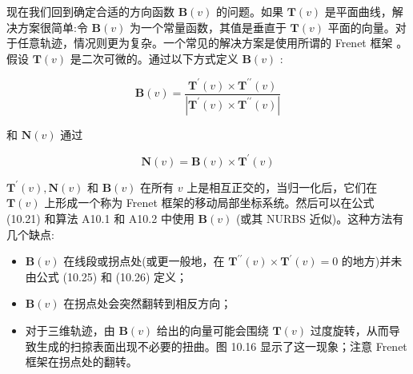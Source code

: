 \documentclass[../main.tex]{subfiles}
\begin{document}
现在我们回到确定合适的方向函数 \(\mathbf{B}\left( v\right)\) 的问题。如果 \(\mathbf{T}\left( v\right)\) 是平面曲线，解决方案很简单:令 \(\mathbf{B}\left( v\right)\) 为一个常量函数，其值是垂直于 \(\mathbf{T}\left( v\right)\) 平面的向量。对于任意轨迹，情况则更为复杂。一个常见的解决方案是使用所谓的 Frenet 框架 \cite{DoCa76,Klok86,Bron92,Silt92}。假设 \(\mathbf{T}\left( v\right)\) 是二次可微的。通过以下方式定义 \(\mathbf{B}\left( v\right)\) :

\[
\mathbf{B}\left( v\right)  = \frac{{\mathbf{T}}^{\prime }\left( v\right)  \times  {\mathbf{T}}^{\prime \prime }\left( v\right) }{\left| {\mathbf{T}}^{\prime }\left( v\right)  \times  {\mathbf{T}}^{\prime \prime }\left( v\right) \right| } \tag{10.25}
\]





和 \(\mathbf{N}\left( v\right)\) 通过

\[
\mathbf{N}\left( v\right)  = \mathbf{B}\left( v\right)  \times  {\mathbf{T}}^{\prime }\left( v\right)  \tag{10.26}
\]

\({\mathbf{T}}^{\prime }\left( v\right) ,\mathbf{N}\left( v\right)\) 和 \(\mathbf{B}\left( v\right)\) 在所有 \(v\) 上是相互正交的，当归一化后，它们在 \(\mathbf{T}\left( v\right)\) 上形成一个称为 Frenet 框架的移动局部坐标系统。然后可以在公式 (10.21) 和算法 A10.1 和 A10.2 中使用 \(\mathbf{B}\left( v\right)\) (或其 NURBS 近似)。这种方法有几个缺点:

\begin{itemize}
\item \(\mathbf{B}\left( v\right)\) 在线段或拐点处(或更一般地，在 \({\mathbf{T}}^{\prime \prime }\left( v\right)  \times  {\mathbf{T}}^{\prime }\left( v\right)  = 0\) 的地方)并未由公式 (10.25) 和 (10.26) 定义；
\end{itemize}

\begin{itemize}
\item \(\mathbf{B}\left( v\right)\) 在拐点处会突然翻转到相反方向；
\end{itemize}

\begin{itemize}
\item 对于三维轨迹，由 \(\mathbf{B}\left( v\right)\) 给出的向量可能会围绕 \(\mathbf{T}\left( v\right)\) 过度旋转，从而导致生成的扫掠表面出现不必要的扭曲。图 10.16 显示了这一现象；注意 Frenet 框架在拐点处的翻转。
\end{itemize}
\end{document}
